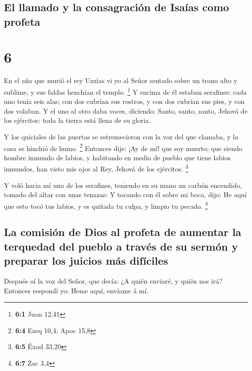 \hypertarget{el-llamado-y-la-consagraciuxf3n-de-isauxedas-como-profeta}{%
\subsection{El llamado y la consagración de Isaías como
profeta}\label{el-llamado-y-la-consagraciuxf3n-de-isauxedas-como-profeta}}

\hypertarget{section-5}{%
\section{6}\label{section-5}}

 En el año que murió el rey Uzzías vi yo al Señor sentado
sobre un trono alto y sublime, y sus faldas henchían el templo.
\footnote{\textbf{6:1} Juan 12,41}  Y encima de él estaban
serafines: cada uno tenía seis alas; con dos cubrían sus rostros, y con
dos cubrían sus pies, y con dos volaban.  Y el uno al otro
daba voces, diciendo: Santo, santo, santo, Jehová de los ejércitos: toda
la tierra está llena de su gloria.

 Y los quiciales de las puertas se estremecieron con la
voz del que clamaba, y la casa se hinchió de humo. \footnote{\textbf{6:4}
  Ezeq 10,4; Apoc 15,8}  Entonces dije: ¡Ay de mí! que soy
muerto; que siendo hombre inmundo de labios, y habitando en medio de
pueblo que tiene labios inmundos, han visto mis ojos al Rey, Jehová de
los ejércitos. \footnote{\textbf{6:5} Éxod 33,20}

 Y voló hacia mí uno de los serafines, teniendo en su mano
un carbón encendido, tomado del altar con unas tenazas:  Y
tocando con él sobre mi boca, dijo: He aquí que esto tocó tus labios, y
es quitada tu culpa, y limpio tu pecado. \footnote{\textbf{6:7} Zac 3,4}

\hypertarget{la-comisiuxf3n-de-dios-al-profeta-de-aumentar-la-terquedad-del-pueblo-a-travuxe9s-de-su-sermuxf3n-y-preparar-los-juicios-muxe1s-difuxedciles}{%
\subsection{La comisión de Dios al profeta de aumentar la terquedad del
pueblo a través de su sermón y preparar los juicios más
difíciles}\label{la-comisiuxf3n-de-dios-al-profeta-de-aumentar-la-terquedad-del-pueblo-a-travuxe9s-de-su-sermuxf3n-y-preparar-los-juicios-muxe1s-difuxedciles}}

 Después oí la voz del Señor, que decía: ¿A quién enviaré,
y quién nos irá? Entonces respondí yo: Heme aquí, envíame á mí.

